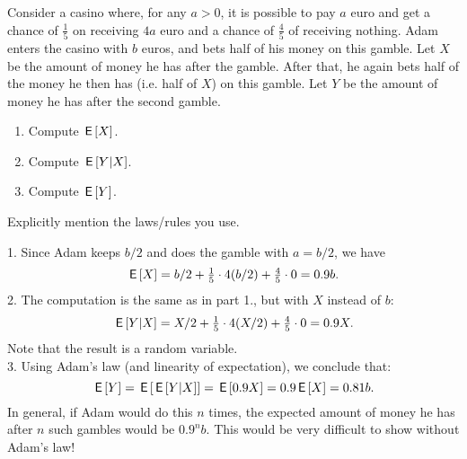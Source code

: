 \begin{exercise}
Consider a casino where, for any $a>0$, it is possible to pay $a$ euro and get a chance of $\tfrac15$ on receiving $4a$ euro and a chance of $\tfrac45$ of receiving nothing.
Adam enters the casino with $b$ euros, and bets half of his money on this gamble.
Let $X$ be the amount of money he has after the gamble.
After that, he again bets half of the money he then has (i.e.
half of $X$) on this gamble.
Let $Y$ be the amount of money he has after the second gamble.
\begin{enumerate}
\item Compute $\,\mathsf{E}\left[X\right]$.
\item Compute $\,\mathsf{E}\left[Y|X\right]$.
\item Compute $\,\mathsf{E}\left[Y\right]$.
\end{enumerate}
Explicitly mention the laws/rules you use.
\begin{solution}

1. Since Adam keeps $b/2$ and does the gamble with $a = b/2$, we have
\begin{equation*}
\,\mathsf{E}\left[X\right] = b/2 + \tfrac15 \cdot 4(b/2) + \tfrac45 \cdot 0 = 0.9 b.
\end{equation*}
2. The computation is the same as in part 1., but with $X$ instead of $b$:
\begin{equation*}
\,\mathsf{E}\left[Y|X\right] = X/2 + \tfrac15 \cdot 4(X/2) + \tfrac45 \cdot 0 = 0.9 X.
\end{equation*}
Note that the result is a random variable. \\
3. Using Adam's law (and linearity of expectation), we conclude that:
\begin{equation*}
\,\mathsf{E}\left[Y\right] = \,\mathsf{E}\left[\,\mathsf{E}\left[Y|X\right]\right] = \,\mathsf{E}\left[0.9X\right] = 0.9\,\mathsf{E}\left[X\right] = 0.81b.
\end{equation*}
In general, if Adam would do this $n$ times, the expected amount of money he has after $n$ such gambles would be $0.9^n b$. This would be very difficult to show without Adam's law!
\end{solution}
\end{exercise}


